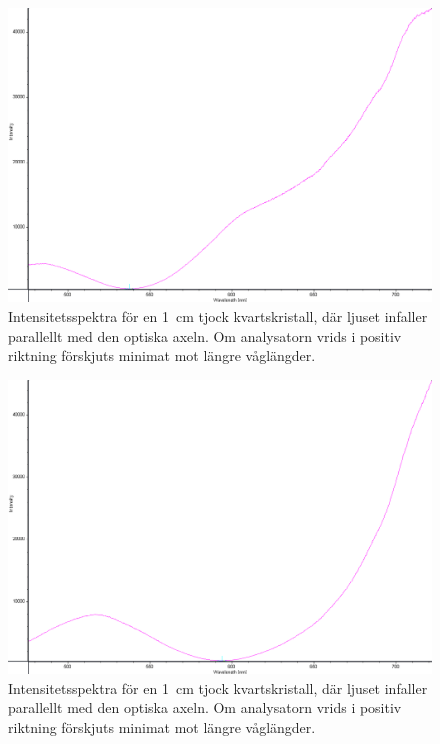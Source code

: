 \documentclass[a4paper]{article}
\begin{document}
\FloatBarrier

\FloatBarrier
\begin{figure}[h!]
	\centering
	\includegraphics[width=\linewidth]{data/spektra_aktiv3_inv}
	\caption{Intensitetsspektra för en \SI{1}{\centi\m} tjock kvartskristall, där ljuset infaller parallellt med den optiska axeln. Om analysatorn vrids i positiv riktning förskjuts minimat mot längre våglängder.}
	\label{fig:}
\end{figure}
\FloatBarrier

\FloatBarrier
\begin{figure}[h!]
	\centering
	\includegraphics[width=\linewidth]{data/spektra_aktiv1_inv}
	\caption{Intensitetsspektra för en \SI{1}{\centi\m} tjock kvartskristall, där ljuset infaller parallellt med den optiska axeln. Om analysatorn vrids i positiv riktning förskjuts minimat mot längre våglängder.}
	\label{fig:}
\end{figure}
\FloatBarrier
\end{document}
